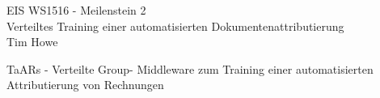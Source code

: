 \documentclass[11pt,oneside,a4paper,notitlepage]{book}
\newcommand{\brand}{TaARs }
\begin{document}
\begin{center}
\Large{EIS WS1516 - Meilenstein 2}\\[3mm]
\normalsize{Verteiltes Training einer automatisierten Dokumentenattributierung}\\[3mm]
\normalsize{Tim Howe}
\end{center}

\brand - Verteilte Group- Middleware zum Training einer automatisierten Attributierung von Rechnungen


\tableofcontents


\newpage















\end{document}
